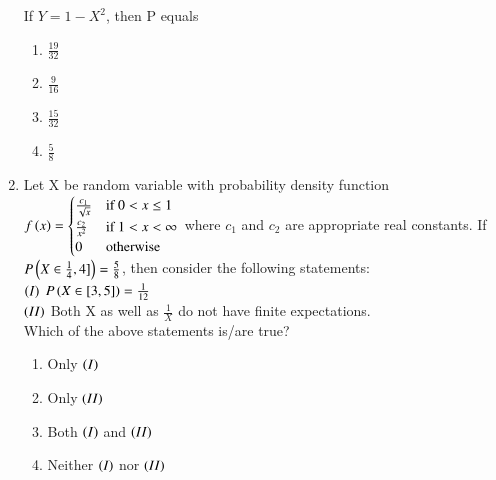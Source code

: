 \documentclass[journal,12pt,onecolumn]{IEEEtran}
\theoremstyle{remark}
\begin{document}
\begin{enumerate}
If $Y=1-X^2$, then P equals
\begin{enumerate}
    \item $\frac{19}{32}$
    \item $\frac{9}{16}$
    \item $\frac{15}{32}$
    \item $\frac{5}{8}$
\end{enumerate}
\item Let X be random variable with probability density function
$f\left(x\right) = 
\begin{cases} 
    \frac{c_1}{\sqrt{x}} & \text{if } 0 < x \leq 1 \\
    \frac{c_2}{x^2} & \text{if } 1 < x < \infty \\
    0 & \text{otherwise}
\end{cases}
$
where $c_1$ and $c_2$ are appropriate real constants. If $P\left(X\in\frac{1}{4},4]\right)=\frac{5}{8}$, then consider the following statements:\\
$\left(I\right)$ $P\left(X \in [3,5]\right)=\frac{1}{12}$\\
$\left(II\right)$ Both X as well as $\frac{1}{X}$ do not have finite expectations. \\
Which of the above statements is/are true?
\begin{enumerate}
    \item Only $\left(I\right)$
    \item Only $\left(II\right)$
    \item Both $\left(I\right)$ and $\left(II\right)$
    \item Neither $\left(I\right)$ nor $\left(II\right)$
\end{enumerate}
\end{enumerate}
\end{document}
